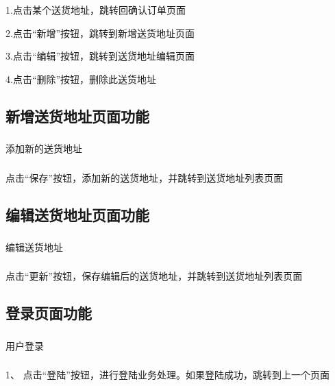 \subsubsection*{}
1.点击某个送货地址，跳转回确认订单页面

2.点击“新增”按钮，跳转到新增送货地址页面

3.点击“编辑”按钮，跳转到送货地址编辑页面

4.点击“删除”按钮，删除此送货地址~\\

\subsection{新增送货地址页面功能}
\subsubsection*{}
添加新的送货地址
\subsubsection*{}
点击“保存”按钮，添加新的送货地址，并跳转到送货地址列表页面~\\

\subsection{编辑送货地址页面功能}
\subsubsection*{}
编辑送货地址
\subsubsection*{}
点击“更新”按钮，保存编辑后的送货地址，并跳转到送货地址列表页面~\\

\subsection{登录页面功能}
\subsubsection*{}
用户登录
\subsubsection*{}
1、 点击“登陆”按钮，进行登陆业务处理。如果登陆成功，跳转到上一个页面

